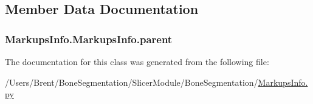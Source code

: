 \subsection{Member Data Documentation}
\hypertarget{class_markups_info_1_1_markups_info_a6fa903f0e32ab7f1ed35668a4aac5097}{}
\subsubsection[{parent}]{\setlength{\rightskip}{0pt plus 5cm}Markups\+Info.\+Markups\+Info.\+parent}\label{class_markups_info_1_1_markups_info_a6fa903f0e32ab7f1ed35668a4aac5097}


The documentation for this class was generated from the following file\+:\begin{DoxyCompactItemize}
\item 
/\+Users/\+Brent/\+Bone\+Segmentation/\+Slicer\+Module/\+Bone\+Segmentation/\hyperlink{_markups_info_8py}{Markups\+Info.\+py}\end{DoxyCompactItemize}
